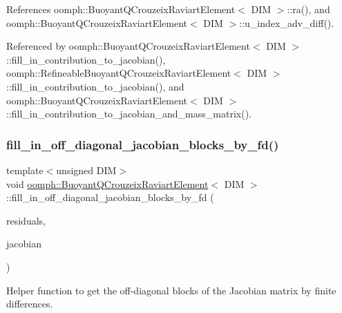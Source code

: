 References oomph\+::\+Buoyant\+Q\+Crouzeix\+Raviart\+Element$<$ D\+I\+M $>$\+::ra(), and oomph\+::\+Buoyant\+Q\+Crouzeix\+Raviart\+Element$<$ D\+I\+M $>$\+::u\+\_\+index\+\_\+adv\+\_\+diff().



Referenced by oomph\+::\+Buoyant\+Q\+Crouzeix\+Raviart\+Element$<$ D\+I\+M $>$\+::fill\+\_\+in\+\_\+contribution\+\_\+to\+\_\+jacobian(), oomph\+::\+Refineable\+Buoyant\+Q\+Crouzeix\+Raviart\+Element$<$ D\+I\+M $>$\+::fill\+\_\+in\+\_\+contribution\+\_\+to\+\_\+jacobian(), and oomph\+::\+Buoyant\+Q\+Crouzeix\+Raviart\+Element$<$ D\+I\+M $>$\+::fill\+\_\+in\+\_\+contribution\+\_\+to\+\_\+jacobian\+\_\+and\+\_\+mass\+\_\+matrix().

\mbox{\label{classoomph_1_1BuoyantQCrouzeixRaviartElement_a5c64aaf8e6cefc31d89c62c28fc6f19b}} 
\subsubsection{\texorpdfstring{fill\+\_\+in\+\_\+off\+\_\+diagonal\+\_\+jacobian\+\_\+blocks\+\_\+by\+\_\+fd()}{fill\_in\_off\_diagonal\_jacobian\_blocks\_by\_fd()}}
{\footnotesize\ttfamily template$<$unsigned D\+IM$>$ \\
void \hyperlink{classoomph_1_1BuoyantQCrouzeixRaviartElement}{oomph\+::\+Buoyant\+Q\+Crouzeix\+Raviart\+Element}$<$ D\+IM $>$\+::fill\+\_\+in\+\_\+off\+\_\+diagonal\+\_\+jacobian\+\_\+blocks\+\_\+by\+\_\+fd (\begin{DoxyParamCaption}\item[{Vector$<$ double $>$ \&}]{residuals,  }\item[{Dense\+Matrix$<$ double $>$ \&}]{jacobian }\end{DoxyParamCaption})\hspace{0.3cm}{\ttfamily [inline]}}



Helper function to get the off-\/diagonal blocks of the Jacobian matrix by finite differences. 



